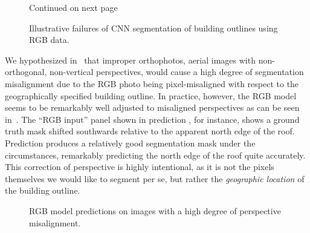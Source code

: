 \begin{figure}[H]
  \centering
  \caption{Continued on next page\textellipsis}
  \label{fig:rgb-prediction-issues}
\end{figure}
\addtocounter{figure}{-1}
\begin{figure}[H]
  \addtocounter{subfigure}{2}
  \caption{%
    Illustrative failures of CNN segmentation of building outlines using RGB data.
  }%
\end{figure}

We hypothesized in~ that improper orthophotos, aerial images with non-orthogonal, non-vertical perspectives, would cause a high degree of segmentation misalignment due to the RGB photo being pixel-misaligned with respect to the geographically specified building outline.
In practice, however, the RGB model seems to be remarkably well adjusted to misaligned perspectives as can be seen in~.
The \enquote{RGB input} panel shown in prediction , for instance, shows a ground truth mask shifted southwards relative to the apparent north edge of the roof.
Prediction  produces a relatively good segmentation mask under the circumstances, remarkably predicting the north edge of the roof quite accurately.
This correction of perspective is highly intentional, as it is not the pixels themselves we would like to segment per se, but rather the \emph{geographic location} of the building outline.

\begin{figure}[H]
  \centering
  \caption{%
    RGB model predictions on images with a high degree of perspective misalignment. \\
  }%
  \label{fig:perspective-correction}
\end{figure}
